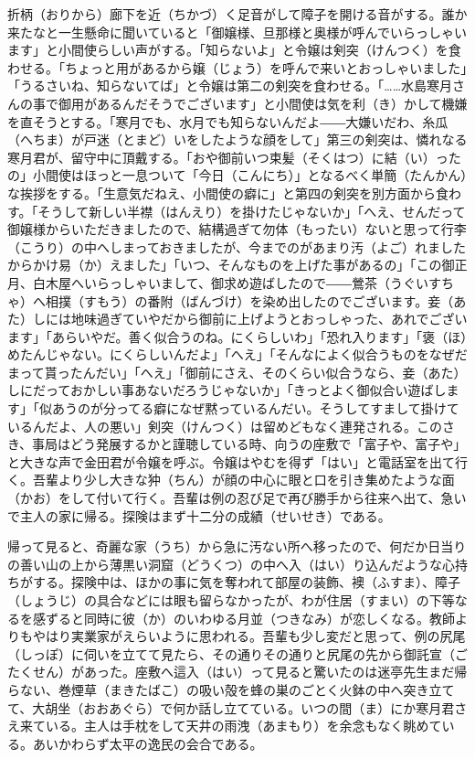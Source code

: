 \documentclass{book}
\begin{document}
折柄（おりから）廊下を近（ちかづ）く足音がして障子を開ける音がする。誰か来たなと一生懸命に聞いていると「御嬢様、旦那様と奥様が呼んでいらっしゃいます」と小間使らしい声がする。「知らないよ」と令嬢は剣突（けんつく）を食わせる。「ちょっと用があるから嬢（じょう）を呼んで来いとおっしゃいました」「うるさいね、知らないてば」と令嬢は第二の剣突を食わせる。「\ldots{}\ldots{}水島寒月さんの事で御用があるんだそうでございます」と小間使は気を利（き）かして機嫌を直そうとする。「寒月でも、水月でも知らないんだよ――大嫌いだわ、糸瓜（へちま）が戸迷（とまど）いをしたような顔をして」第三の剣突は、憐れなる寒月君が、留守中に頂戴する。「おや御前いつ束髪（そくはつ）に結（い）ったの」小間使はほっと一息ついて「今日（こんにち）」となるべく単簡（たんかん）な挨拶をする。「生意気だねえ、小間使の癖に」と第四の剣突を別方面から食わす。「そうして新しい半襟（はんえり）を掛けたじゃないか」「へえ、せんだって御嬢様からいただきましたので、結構過ぎて勿体（もったい）ないと思って行李（こうり）の中へしまっておきましたが、今までのがあまり汚（よご）れましたからかけ易（か）えました」「いつ、そんなものを上げた事があるの」「この御正月、白木屋へいらっしゃいまして、御求め遊ばしたので――鶯茶（うぐいすちゃ）へ相撲（すもう）の番附（ばんづけ）を染め出したのでございます。妾（あた）しには地味過ぎていやだから御前に上げようとおっしゃった、あれでございます」「あらいやだ。善く似合うのね。にくらしいわ」「恐れ入ります」「褒（ほ）めたんじゃない。にくらしいんだよ」「へえ」「そんなによく似合うものをなぜだまって貰ったんだい」「へえ」「御前にさえ、そのくらい似合うなら、妾（あた）しにだっておかしい事あないだろうじゃないか」「きっとよく御似合い遊ばします」「似あうのが分ってる癖になぜ黙っているんだい。そうしてすまして掛けているんだよ、人の悪い」剣突（けんつく）は留めどもなく連発される。このさき、事局はどう発展するかと謹聴している時、向うの座敷で「富子や、富子や」と大きな声で金田君が令嬢を呼ぶ。令嬢はやむを得ず「はい」と電話室を出て行く。吾輩より少し大きな狆（ちん）が顔の中心に眼と口を引き集めたような面（かお）をして付いて行く。吾輩は例の忍び足で再び勝手から往来へ出て、急いで主人の家に帰る。探険はまず十二分の成績（せいせき）である。

帰って見ると、奇麗な家（うち）から急に汚ない所へ移ったので、何だか日当りの善い山の上から薄黒い洞窟（どうくつ）の中へ入（はい）り込んだような心持ちがする。探険中は、ほかの事に気を奪われて部屋の装飾、襖（ふすま）、障子（しょうじ）の具合などには眼も留らなかったが、わが住居（すまい）の下等なるを感ずると同時に彼（か）のいわゆる月並（つきなみ）が恋しくなる。教師よりもやはり実業家がえらいように思われる。吾輩も少し変だと思って、例の尻尾（しっぽ）に伺いを立てて見たら、その通りその通りと尻尾の先から御託宣（ごたくせん）があった。座敷へ這入（はい）って見ると驚いたのは迷亭先生まだ帰らない、巻煙草（まきたばこ）の吸い殻を蜂の巣のごとく火鉢の中へ突き立てて、大胡坐（おおあぐら）で何か話し立てている。いつの間（ま）にか寒月君さえ来ている。主人は手枕をして天井の雨洩（あまもり）を余念もなく眺めている。あいかわらず太平の逸民の会合である。
\end{document}
